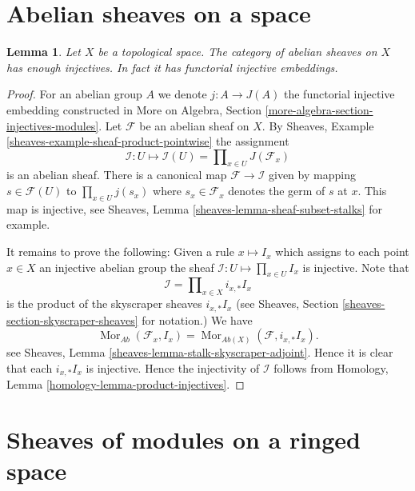 \documentclass{stacks-project}
\theoremstyle{plain}
\newtheorem{lemma}[subsection]{Lemma}
\theoremstyle{definition}
\theoremstyle{remark}
\numberwithin{equation}{subsection}
\def\Mor{\mathop{\mathrm{Mor}}\nolimits}
\begin{document}
\section{Abelian sheaves on a space}
\label{section-abelian-sheaves-space}


\begin{lemma}
\label{lemma-abelian-sheaves-space}
Let $X$ be a topological space.
The category of abelian sheaves on $X$ has enough injectives.
In fact it has functorial injective embeddings.
\end{lemma}

\begin{proof}
For an abelian group $A$ we denote $j : A \to J(A)$ the functorial
injective embedding constructed in
More on Algebra, Section \ref{more-algebra-section-injectives-modules}.
Let $\mathcal{F}$ be an abelian sheaf on $X$.
By Sheaves, Example \ref{sheaves-example-sheaf-product-pointwise}
the assignment
$$
\mathcal{I} : U \mapsto
\mathcal{I}(U) = \prod\nolimits_{x\in U} J(\mathcal{F}_x)
$$
is an abelian sheaf. There is a canonical map $\mathcal{F} \to \mathcal{I}$
given by mapping $s \in \mathcal{F}(U)$ to $\prod_{x \in U} j(s_x)$
where $s_x \in \mathcal{F}_x$ denotes the germ of $s$ at $x$.
This map is injective, see
Sheaves, Lemma \ref{sheaves-lemma-sheaf-subset-stalks}
for example.

\medskip\noindent
It remains to prove the following: Given a rule
$x \mapsto I_x$ which assigns to each point $x \in X$ an injective
abelian group the sheaf $\mathcal{I} : U \mapsto \prod_{x \in U} I_x$
is injective. Note that
$$
\mathcal{I} = \prod\nolimits_{x \in X} i_{x, *}I_x
$$
is the product of the skyscraper sheaves $i_{x, *}I_x$ (see
Sheaves, Section \ref{sheaves-section-skyscraper-sheaves} for notation.)
We have
$$
\Mor_{\textit{Ab}}(\mathcal{F}_x, I_x)
=
\Mor_{\textit{Ab}(X)}(\mathcal{F}, i_{x, *}I_x).
$$
see Sheaves, Lemma \ref{sheaves-lemma-stalk-skyscraper-adjoint}. Hence it is
clear that each $i_{x, *}I_x$ is injective. Hence the injectivity of
$\mathcal{I}$ follows from
Homology, Lemma \ref{homology-lemma-product-injectives}.
\end{proof}









\section{Sheaves of modules on a ringed space}
\label{section-sheaves-modules-space}
\end{document}

